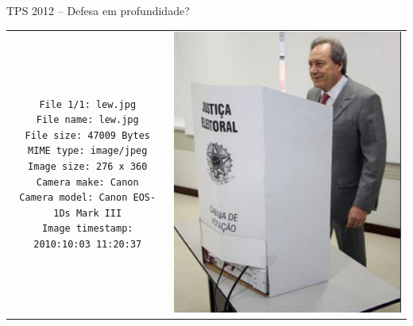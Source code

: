 \documentclass[10pt]{beamer}
\begin{document}
\begin{frame}[fragile]{TPS 2012 -- Defesa em profundidade?}
\begin{table}
 \begin{tabular}{cc}
\begin{minipage}{5cm}
\begin{verbatim}
File 1/1: lew.jpg
File name: lew.jpg
File size: 47009 Bytes
MIME type: image/jpeg
Image size: 276 x 360
Camera make: Canon
Camera model: Canon EOS-1Ds Mark III
Image timestamp: 2010:10:03 11:20:37
\end{verbatim}
\end{minipage} &
\includegraphics[scale=0.4]{lew.jpg}
 \end{tabular}
\end{table}
\end{frame}
\end{document}
